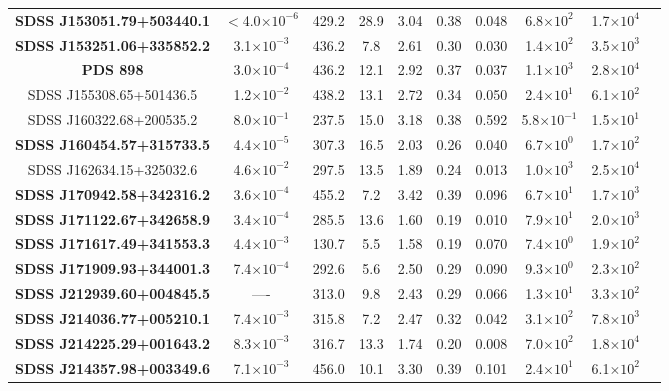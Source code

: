 \begin{table}
\begin{tabular}{|c| c| c| c| c| c| c| c| c|c|}
\textbf{SDSS J153051.79+503440.1} 	&	$<$4.0$\times 10^{-6}$	&429.2			&28.9	&3.04		&0.38		&0.048		&6.8$\times 10^2$		&	1.7$\times 10^4$\\
\textbf{SDSS J153251.06+335852.2} 	&	3.1$\times 10^{-3}$		&436.2			&7.8		&2.61		&0.30		&0.030		&1.4$\times 10^2$		&	3.5$\times 10^3$\\
\textbf{PDS 898}                  					&	3.0$\times 10^{-4}$		&436.2			&12.1	&2.92		&0.37		&0.037		&1.1$\times 10^3$		&	2.8$\times 10^4$\\
SDSS J155308.65+501436.5 	&	1.2$\times 10^{-2}$		&438.2			&13.1	&2.72		&0.34		&0.050		&2.4$\times 10^1$		&	6.1$\times 10^2$\\
SDSS J160322.68+200535.2 	&	8.0$\times 10^{-1}$		&237.5			&15.0	&3.18		&0.38		&0.592		&5.8$\times 10^{-1}$	&	1.5$\times 10^{1}$\\
\textbf{SDSS J160454.57+315733.5} 	&	4.4$\times 10^{-5}$		&307.3			&16.5	&2.03		&0.26		&0.040		&6.7$\times 10^0$		&	1.7$\times 10^2$\\
SDSS J162634.15+325032.6 	&	4.6$\times 10^{-2}$		&297.5			&13.5	&1.89		&0.24		&0.013		&1.0$\times 10^3$		&	2.5$\times 10^4$\\
\textbf{SDSS J170942.58+342316.2} 	&	3.6$\times 10^{-4}$		&455.2			&7.2		&3.42		&0.39		&0.096		&6.7$\times 10^1$		&	1.7$\times 10^3$\\
\textbf{SDSS J171122.67+342658.9} 	&	3.4$\times 10^{-4}$		&285.5			&13.6	&1.60		&0.19		&0.010		&7.9$\times 10^1$		&	2.0$\times 10^3$\\
\textbf{SDSS J171617.49+341553.3} 	&	4.4$\times 10^{-3}$		&130.7			&5.5		&1.58		&0.19		&0.070		&7.4$\times 10^0$		&	1.9$\times 10^2$\\
\textbf{SDSS J171909.93+344001.3} 	&	7.4$\times 10^{-4}$		&292.6			&5.6		&2.50		&0.29		&0.090		&9.3$\times 10^0$		&	2.3$\times 10^2$\\
\textbf{SDSS J212939.60+004845.5} 	&	----									&313.0			&9.8		&2.43		&0.29		&0.066		&1.3$\times 10^1$		&	3.3$\times 10^2$\\
\textbf{SDSS J214036.77+005210.1} 	&	7.4$\times 10^{-3}$		&315.8			&7.2		&2.47		&0.32		&0.042		&3.1$\times 10^2$		&	7.8$\times 10^3$\\
\textbf{SDSS J214225.29+001643.2} 	&	8.3$\times 10^{-3}$		&316.7			&13.3	&1.74		&0.20		&0.008		&7.0$\times 10^2$		&	1.8$\times 10^4$\\
\textbf{SDSS J214357.98+003349.6} 	&	7.1$\times 10^{-3}$		&456.0			&10.1	&3.30		&0.39		&0.101		&2.4$\times 10^1$		&	6.1$\times 10^2$\\

\end{tabular}
\end{table}
